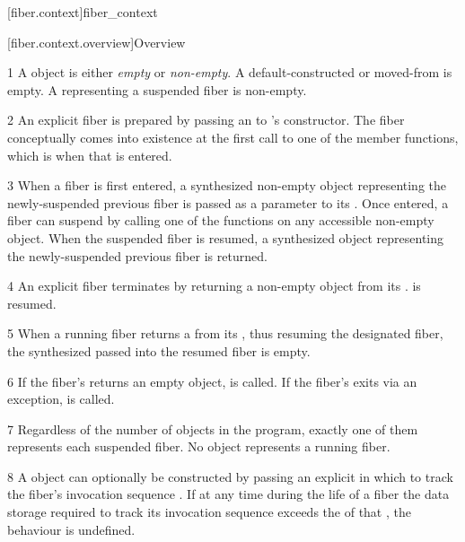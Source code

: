 [fiber.context]{fiber\_context}

[fiber.context.overview]{Overview}

1 A \fiber object is either \emph{empty} or \emph{non-empty}. A
default-constructed or moved-from \fiber is empty. A \fiber
representing a suspended fiber is non-empty.

2 An explicit fiber is prepared by passing an \emph{\entryfn} to \fiber's
constructor. The fiber conceptually comes into existence at the first call to
one of the \anyresume member functions, which is when that \entryfn is
entered.

3 When a fiber is first entered, a synthesized non-empty \fiber object
representing the newly-suspended previous fiber is passed as a parameter to
its \entryfn. Once entered, a fiber can suspend by calling one of the \anyresume
functions on any accessible non-empty \fiber object. When the
suspended fiber is resumed, a synthesized \fiber object
representing the newly-suspended previous fiber is returned.

4 An explicit fiber terminates by returning a non-empty \fiber object from
its \entryfn.  is resumed.



5 When a running fiber returns a \fiber from its \entryfn, thus resuming the
designated fiber, the synthesized \fiber passed into the resumed fiber is
empty.

6 If the fiber's \entryfn returns an empty \fiber object,  is called.
If the fiber's \entryfn exits via an exception,  is called.

7 Regardless of the number of \fiber objects in the program, exactly one of them
represents each suspended fiber. No \fiber object represents a running fiber.

8 A \fiber object can optionally be constructed by passing an explicit
 in which to track the fiber's invocation sequence
. If at any time during the life of a fiber the
data storage required to track its invocation sequence exceeds the
 of that , the behaviour is undefined.

